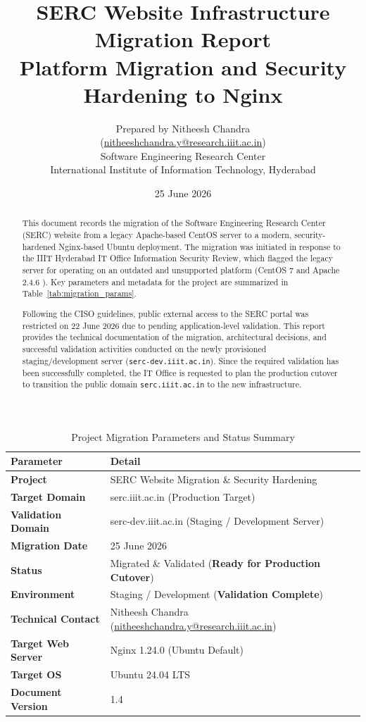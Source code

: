 \documentclass[11pt,a4paper,DIV=16,headings=normal,parskip=half]{scrartcl}
\title{
\Large SERC Website Infrastructure Migration Report\\
\vspace{0.2cm}
\large Platform Migration and Security Hardening to Nginx
}
\author{Prepared by Nitheesh Chandra \\ \small (\href{mailto:nitheeshchandra.y@research.iiit.ac.in}{nitheeshchandra.y@research.iiit.ac.in}) \\ \small Software Engineering Research Center \\ \small International Institute of Information Technology, Hyderabad}
\date{25 June 2026}
\begin{document}
\maketitle

\begin{table}[htbp]
\centering
\caption{Project Migration Parameters and Status Summary}
\label{tab:migration_params}
\begin{tabular}{@{}ll@{}}
\toprule
\textbf{Parameter} & \textbf{Detail} \\
\midrule
\textbf{Project} & SERC Website Migration \& Security Hardening \\
\textbf{Target Domain} & serc.iiit.ac.in (Production Target) \\
\textbf{Validation Domain} & serc-dev.iiit.ac.in (Staging / Development Server) \\
\textbf{Migration Date} & 25 June 2026 \\
\textbf{Status} & Migrated \& Validated (\colorbox{highlightgreen}{\textbf{Ready for Production Cutover}}) \\
\textbf{Environment} & Staging / Development (\colorbox{highlightgreen}{\textbf{Validation Complete}}) \\
\textbf{Technical Contact} & Nitheesh Chandra (\href{mailto:nitheeshchandra.y@research.iiit.ac.in}{nitheeshchandra.y@research.iiit.ac.in}) \\
\textbf{Target Web Server} & Nginx 1.24.0 (Ubuntu Default) \\
\textbf{Target OS} & Ubuntu 24.04 LTS \\
\textbf{Document Version} & 1.4 \\
\bottomrule
\end{tabular}
\end{table}

\vspace{0.5cm}

\begin{abstract}
This document records the migration of the Software Engineering Research Center (SERC) website from a legacy Apache-based CentOS server to a modern, security-hardened Nginx-based Ubuntu deployment. The migration was initiated in response to the IIIT Hyderabad IT Office Information Security Review, which flagged the legacy server for operating on an outdated and unsupported platform (CentOS 7 \cite{centos7-eol} and Apache 2.4.6 \cite{apache-cves}). Key parameters and metadata for the project are summarized in Table~\ref{tab:migration_params}.

Following the CISO guidelines, public external access to the SERC portal was restricted on 22 June 2026 due to pending application-level validation. This report provides the technical documentation of the migration, architectural decisions, and successful validation activities conducted on the newly provisioned staging/development server (\texttt{serc-dev.iiit.ac.in}). Since the required validation has been successfully completed, the IT Office is requested to plan the production cutover to transition the public domain \texttt{serc.iiit.ac.in} to the new infrastructure.
\end{abstract}
\pagebreak
\end{document}
